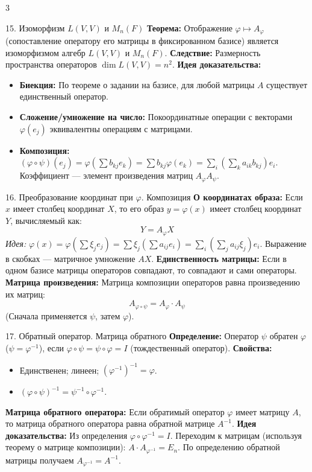 \documentclass[8pt, a4paper, landscape]{extarticle}
\begin{document}
\begin{multicols*}{3}
\begin{ticket}{15. Изоморфизм $L(V,V)$ и $M_n(F)$}
\textbf{Теорема:} Отображение $\varphi \mapsto A_\varphi$ (сопоставление оператору его матрицы в фиксированном базисе) является изоморфизмом алгебр $L(V, V)$ и $M_n(F)$.
\textbf{Следствие:} Размерность пространства операторов $\dim L(V, V) = n^2$.
\tcblower
\textbf{Идея доказательства:} 
\begin{itemize}
    \item \textbf{Биекция:} По теореме о задании на базисе, для любой матрицы $A$ существует единственный оператор.
    \item \textbf{Сложение/умножение на число:} Покоординатные операции с векторами $\varphi(e_j)$ эквивалентны операциям с матрицами.
    \item \textbf{Композиция:} $(\varphi \circ \psi)(e_j) = \varphi(\sum b_{kj}e_k) = \sum b_{kj}\varphi(e_k) = \sum_i (\sum_k a_{ik}b_{kj}) e_i$. Коэффициент --- элемент произведения матриц $A_\varphi A_\psi$.
\end{itemize}
\end{ticket}

\begin{ticket}{16. Преобразование координат при $\varphi$. Композиция}
\textbf{О координатах образа:} Если $x$ имеет столбец координат $X$, то его образ $y = \varphi(x)$ имеет столбец координат $Y$, вычисляемый как:
\[Y = A_\varphi X\]
\textit{Идея:} $\varphi(x) = \varphi(\sum \xi_j e_j) = \sum \xi_j (\sum a_{ij} e_i) = \sum_i (\sum_j a_{ij}\xi_j) e_i$. Выражение в скобках --- матричное умножение $AX$.
\tcblower
\textbf{Единственность матрицы:} Если в одном базисе матрицы операторов совпадают, то совпадают и сами операторы.
\textbf{Матрица произведения:} Матрица композиции операторов равна произведению их матриц:
\[A_{\varphi \circ \psi} = A_\varphi \cdot A_\psi\]
(Сначала применяется $\psi$, затем $\varphi$).
\end{ticket}

\begin{ticket}{17. Обратный оператор. Матрица обратного}
\textbf{Определение:} Оператор $\psi$ обратен $\varphi$ ($\psi = \varphi^{-1}$), если $\varphi \circ \psi = \psi \circ \varphi = I$ (тождественный оператор).
\textbf{Свойства:}
\begin{itemize}
    \item Единственен; линеен; $(\varphi^{-1})^{-1} = \varphi$.
    \item $(\varphi \circ \psi)^{-1} = \psi^{-1} \circ \varphi^{-1}$.
\end{itemize}
\tcblower
\textbf{Матрица обратного оператора:}
Если обратимый оператор $\varphi$ имеет матрицу $A$, то матрица обратного оператора равна обратной матрице $A^{-1}$.
\textbf{Идея доказательства:} 
Из определения $\varphi \circ \varphi^{-1} = I$. 
Переходим к матрицам (используя теорему о матрице композиции): $A \cdot A_{\varphi^{-1}} = E_n$. 
По определению обратной матрицы получаем $A_{\varphi^{-1}} = A^{-1}$.
\end{ticket}


\end{multicols*}
\end{document}
